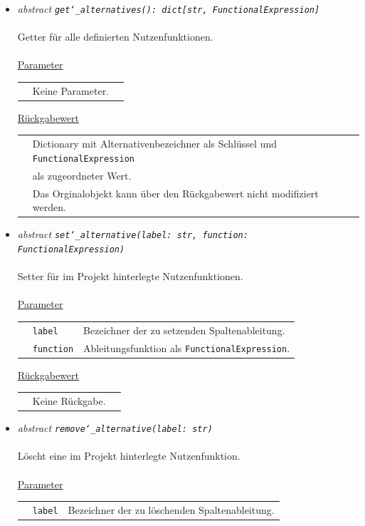 \documentclass{article}
\begin{document}
\begin{itemize}
\item \textit{\flqq{}abstract\frqq} \texttt{\textit{get\char`_alternatives(): dict[str, FunctionalExpression]}}\\\\
Getter für alle definierten Nutzenfunktionen.
\\\\
\underline{Parameter}\\
\begin{tabular}{lll}
 & Keine Parameter.\\
\end{tabular}

\underline{Rückgabewert}\\
\begin{tabular}{lll}
 & Dictionary mit Alternativenbezeichner als Schlüssel und \texttt{FunctionalExpression}\\
 & als zugeordneter Wert.\\
 & Das Orginalobjekt kann über den Rückgabewert nicht modifiziert werden.\\
\end{tabular}



\item \textit{\flqq{}abstract\frqq} \texttt{\textit{set\char`_alternative(label: str, function: FunctionalExpression)}}\\\\
Setter für im Projekt hinterlegte Nutzenfunktionen.
\\\\
\underline{Parameter}\\
\begin{tabular}{lll}
 & \texttt{label} & Bezeichner der zu setzenden Spaltenableitung.\\
 & \texttt{function} & Ableitungsfunktion als \texttt{FunctionalExpression}.\\
\end{tabular}

\underline{Rückgabewert}\\
\begin{tabular}{lll}
 & Keine Rückgabe.\\
\end{tabular}


\item \textit{\flqq{}abstract\frqq} \texttt{\textit{remove\char`_alternative(label: str)}}\\\\
Löscht eine im Projekt hinterlegte Nutzenfunktion.
\\\\
\underline{Parameter}\\
\begin{tabular}{lll}
 & \texttt{label} & Bezeichner der zu löschenden Spaltenableitung.\\
\end{tabular}


\end{itemize}
\end{document}
